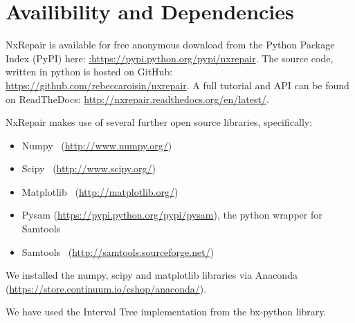\documentclass[12pt]{article}
\begin{document}
\clearpage

\section{Availibility and Dependencies}
NxRepair is available for free anonymous download from the Python Package Index (PyPI) here: \url{:https://pypi.python.org/pypi/nxrepair}.
The source code, written in python is hosted on GitHub: \url{https://github.com/rebeccaroisin/nxrepair}.
A full tutorial and API can be found on ReadTheDocs: \url{http://nxrepair.readthedocs.org/en/latest/}.

NxRepair makes use of several further open source libraries, specifically:

\begin{itemize}
\item[] Numpy~\cite{numpy} (\url{http://www.numpy.org/})
\item[] Scipy~\cite{scipy} (\url{http://www.scipy.org/})
\item[] Matplotlib~\cite{Hunter2007} (\url{http://matplotlib.org/})
\item[] Pysam (\url{https://pypi.python.org/pypi/pysam}), the python wrapper for Samtools
\item[] Samtools~\cite{li2009} (\url{http://samtools.sourceforge.net/})
\end{itemize}

We installed the numpy, scipy and matplotlib libraries via Anaconda (\url{https://store.continuum.io/cshop/anaconda/}).

We have used the Interval Tree implementation from the bx-python library.

\clearpage


\end{document}
